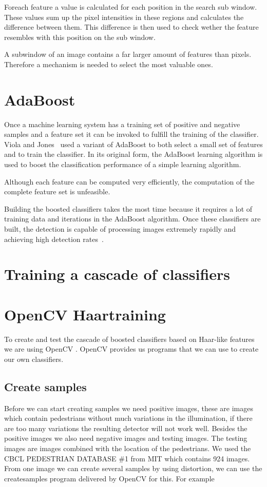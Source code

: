 \documentclass{article}
\begin{document}
\par
Foreach feature a value is calculated for each position in the search sub window. These values sum up the pixel intensities in these regions and calculates the difference between them. This difference is then used to check wether the feature resembles with this position on the sub window.

\par
A subwindow of an image contains a far larger amount of features than pixels. Therefore a mechanism is needed to select the most valuable ones.

\section{AdaBoost}

Once a machine learning system has a training set of positive and negative samples and a feature set it can be invoked to fulfill the training of the classifier. Viola and Jones~\cite{viola2001rapid} used a variant of AdaBoost to both select a small set of features and to train the classifier. In its original form, the AdaBoost learning algorithm is used to boost the classification performance of a simple  learning algorithm.

\par
Although each feature can be computed very efficiently, the computation of the complete feature set is unfeasible.

\par
Building the boosted classifiers takes the most time because it requires a lot of training data and iterations in the AdaBoost algorithm. Once these classifiers are built, the detection is capable of processing images extremely rapidly and achieving high detection rates~\cite{viola2001rapid}.

\section{Training a cascade of classifiers}

\section{OpenCV Haartraining}
To create and test the cascade of boosted classifiers based on Haar-like features we are using OpenCV \cite{opencv_library}. OpenCV provides us programs that we can use to create our own classifiers.

\subsection{Create samples}
Before we can start creating samples we need positive images, these are images which contain pedestrians without much variations in the illumination, if there are too many variations the resulting detector will not work well.
Besides the positive images we also need negative images and testing images. The testing images are images combined with the location of the pedestrians. We used the CBCL PEDESTRIAN DATABASE \#1 from MIT which contains 924 images.
From one image we can create several samples by using distortion, we can use the createsamples program delivered by OpenCV for this. For example 
\end{document}
